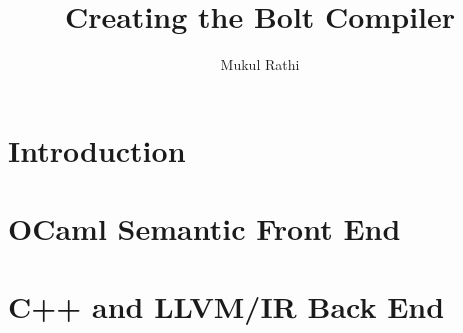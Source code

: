 \documentclass[8pt,a4paper]{book}
\begin{document}
\frontmatter

\title{Creating the Bolt Compiler
}
\author{Mukul Rathi}

\maketitle

%
\cleardoublepage
\tableofcontents
%
%
%
%

\mainmatter

\part{Introduction}


%

\part{OCaml Semantic Front End}







\part{C++ and LLVM/IR Back End}








%
%

\end{document}
